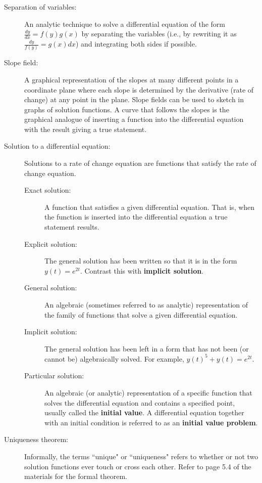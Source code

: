 \begin{description}
\item[Separation of variables:] An analytic technique to solve a differential equation of the form $\frac{dy}{dx}=f(y)g(x)$ by separating the variables (i.e., by rewriting it as $\frac{dy}{f(y)}=g(x)dx$) and integrating both sides if possible.
\item[Slope field:] A graphical representation of the slopes at many different points in a coordinate plane where each slope is determined by the derivative (rate of change) at any point in the plane. Slope fields can be used to sketch in graphs of solution functions. A curve that follows the slopes is the graphical analogue of inserting a function into the differential equation with the result giving a true statement.
\item[Solution to a differential equation:] Solutions to a rate of change equation are functions that satisfy the rate of change equation.
\begin{description}
\item[Exact solution:] A function that satisfies a given differential equation. That is, when the function is inserted into the differential equation a true statement results.
\item[Explicit solution:] The general solution has been written so that it is in the form $y(t) = e^{2t}$. Contrast this with \textbf{implicit solution}.
\item[General solution:] An algebraic (sometimes referred to as analytic) representation of the family of functions that solve a given differential equation.
\item[Implicit solution:] The general solution has been left in a form that has not been (or cannot be) algebraically solved. For example, $y(t)^5 + y(t) = e^{2t}$.
\item[Particular solution:] An algebraic (or analytic) representation of a specific function that solves the differential equation and contains a specified point, usually called the \textbf{initial value}. A differential equation together with an initial condition is referred to as an \textbf{initial value problem}.
\end{description}
\item[Uniqueness theorem:] Informally, the terms ``unique" or ``uniqueness" refers to whether or not two solution functions ever touch or cross each other. Refer to page 5.4 of the materials for the formal theorem.

\end{description}
